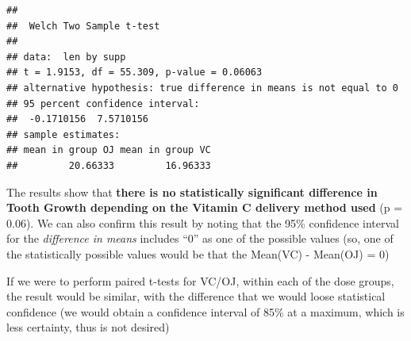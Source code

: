 \documentclass[]{article}
\begin{document}
\begin{verbatim}
## 
##  Welch Two Sample t-test
## 
## data:  len by supp
## t = 1.9153, df = 55.309, p-value = 0.06063
## alternative hypothesis: true difference in means is not equal to 0
## 95 percent confidence interval:
##  -0.1710156  7.5710156
## sample estimates:
## mean in group OJ mean in group VC 
##         20.66333         16.96333
\end{verbatim}

The results show that \textbf{there is no statistically significant
difference in Tooth Growth depending on the Vitamin C delivery method
used} (p = 0.06). We can also confirm this result by noting that the
95\% confidence interval for the \emph{difference in means} includes
``0'' as one of the possible values (so, one of the statistically
possible values would be that the Mean(VC) - Mean(OJ) = 0) ~

If we were to perform paired t-tests for VC/OJ, within each of the dose
groups, the result would be similar, with the difference that we would
loose statistical confidence (we would obtain a confidence interval of
85\% at a maximum, which is less certainty, thus is not desired)
\end{document}
